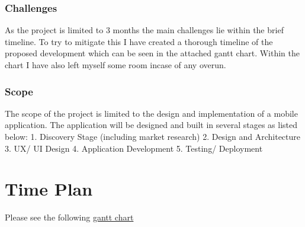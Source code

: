\documentclass[12pt]{article}
\begin{document}
\subsubsection{Challenges}
As the project is limited to 3 months the main challenges lie within the brief timeline. To try to mitigate this I have created a thorough timeline of the proposed development which can be seen in the attached gantt chart. Within the chart I have also left myself some room incase of any overun. 

\subsubsection{Scope}
The scope of the project is limited to the design and implementation of a mobile application. The application will be designed and built in several stages as listed below:
1. Discovery Stage (including market research)
2. Design and Architecture
3. UX/ UI Design
4. Application Development
5. Testing/ Deployment


\section{Time Plan}
Please see the following \href{https://drive.google.com/file/d/1Yn_NGCbC0ACyhp4jYBQV2O3T7yqof0sN/view?usp=sharing}{gantt chart}
\end{document}
